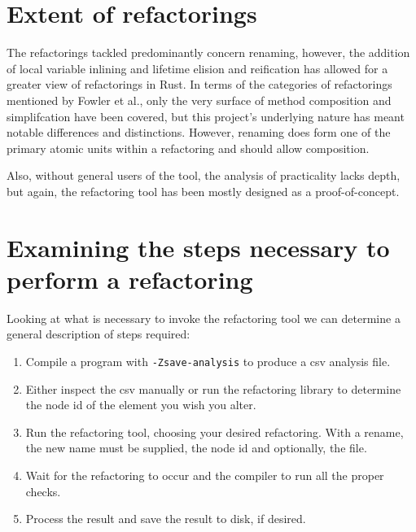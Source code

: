 

\section{Extent of refactorings}\label{S:extentn}

The refactorings tackled predominantly concern renaming, however, the addition of local variable inlining and lifetime elision and reification has allowed for a greater view of refactorings in Rust. In terms of the categories of refactorings mentioned by Fowler et al., only the very surface of method composition and simplifcation have been covered, but this project's underlying nature has meant notable differences and distinctions. However, renaming does form one of the primary atomic units within a refactoring and should allow composition.

 Also, without general users of the tool, the analysis of practicality lacks depth, but again, the refactoring tool has been mostly designed as a proof-of-concept.



\section{Examining the steps necessary to perform a refactoring}\label{S:stepsn}

Looking at what is necessary to invoke the refactoring tool we can determine a general description of steps required:

\begin{enumerate}
\item Compile a program with {\verb|-Zsave-analysis|} to produce a csv analysis file.
\item Either inspect the csv manually or run the refactoring library to determine the node id of the element you wish you alter.
\item Run the refactoring tool, choosing your desired refactoring. With a rename, the new name must be supplied, the node id and optionally, the file.
\item Wait for the refactoring to occur and the compiler to run all the proper checks. 
\item Process the result and save the result to disk, if desired.
\end{enumerate}

